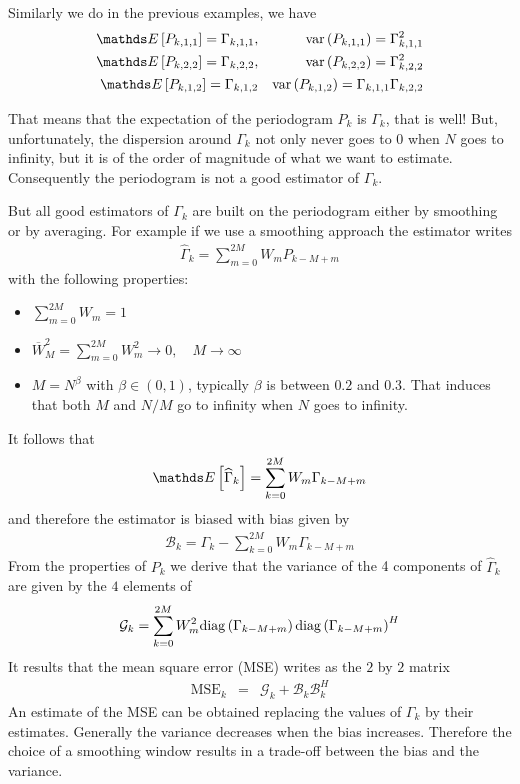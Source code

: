 Similarly we do in the previous examples, we have
\begin{eqnarray}
 \esp{P_{k,1,1}}= \Gamma_{k,1,1},&& 
 \var{P_{k,1,1}}= \Gamma_{k,1,1}^{2}
 \\
 \esp{P_{k,2,2}}= \Gamma_{k,2,2}, &&
 \var{P_{k,2,2}}= \Gamma_{k,2,2}^{2}
 \\
 \esp{P_{k,1,2}}= \Gamma_{k,1,2} &&
 \var{P_{k,1,2}}= \Gamma_{k,1,1}\Gamma_{k,2,2}
 \end{eqnarray}


That means that the expectation of the periodogram $P_{k}$ is $\Gamma_{k}$, that is well! But, unfortunately, the dispersion around $\Gamma_{k}$ not only never goes to 0 when $N$ goes to infinity, but it is of the order of magnitude of what we want to estimate. Consequently the periodogram is not a good estimator of $\Gamma_{k}$. 

But all good estimators of $\Gamma_{k}$ are built on the periodogram either by smoothing or by averaging. For example if we use a smoothing approach the estimator writes
\begin{eqnarray}
 \label{eq:smoothperiodogram}
 \hat \Gamma_{k} = \sum_{m=0}^{2M}W_{m}P_{k-M+m}
\end{eqnarray}
with the following properties:
\begin{itemize}
\item
$\sum_{m=0}^{2M}W_{m}=1$
\item
$
 {\overline W}_{M}^{2}=\sum_{m=0}^{2M}W_{m}^{2}\rightarrow 0, \quad M \rightarrow \infty
$
\item
$M=N^{\beta}$ with $\beta\in(0,1)$, typically $\beta$ is between $0.2$ and $0.3$. That induces that both $M$ and $N/M$ go to infinity when $N$ goes to infinity.
\end{itemize}

It follows that
$$
 \esp{\hat \Gamma_{k}}=\sum_{k=0}^{2M}W_{m}\Gamma_{k-M+m}
$$
and therefore the estimator is biased with bias given by
\begin{eqnarray}
\label{eq:recallbiassmoothperiodogram}
 \mathcal{B}_{k}= \Gamma_{k}-\sum_{k=0}^{2M}W_{m}\Gamma_{k-M+m}
\end{eqnarray}
From the properties of $P_{k}$ we derive that the variance of the 4 components of $\hat \Gamma_{k}$ are given by the $4$ elements of
\begin{eqnarray*}
 \mathcal{G}_{k}= \sum_{k=0}^{2M}W_{m}^{2}
 \mathrm{diag}\left( \Gamma_{k-M+m} \right)\mathrm{diag}\left( \Gamma_{k-M+m} \right)^{H}
\end{eqnarray*}
It results that the mean square error (MSE) writes as the $2$ by $2$ matrix
\begin{eqnarray*}
 \mathrm{MSE}_{k}
 &=&
 \mathcal{G}_{k}+\mathcal{B}_{k}\mathcal{B}_{k}^{H}
\end{eqnarray*}
An estimate of the MSE can be obtained replacing the values of $\Gamma_{k}$ by their estimates.  Generally the variance decreases when the bias increases. Therefore the choice of a smoothing window results in a trade-off between the bias and the variance.


